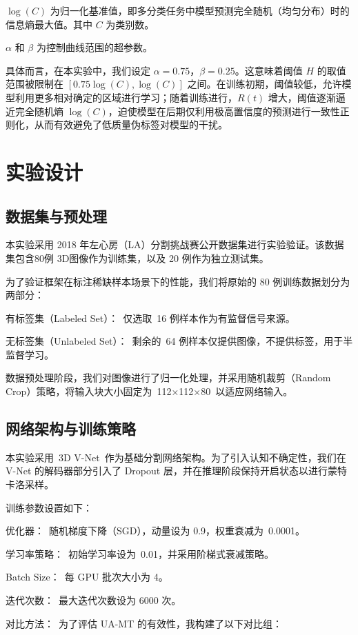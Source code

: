 \documentclass{xduugthesis}
\begin{document}
$\log(C)$ 为归一化基准值，即多分类任务中模型预测完全随机（均匀分布）时的信息熵最大值。其中 $C$ 为类别数。

$\alpha$ 和 $\beta$ 为控制曲线范围的超参数。


具体而言，在本实验中，我们设定 $\alpha=0.75$，$\beta=0.25$。这意味着阈值 $H$ 的取值范围被限制在 $[0.75\log(C), \log(C)]$ 之间。在训练初期，阈值较低，允许模型利用更多相对确定的区域进行学习；随着训练进行，$R(t)$ 增大，阈值逐渐逼近完全随机熵 $\log(C)$，迫使模型在后期仅利用极高置信度的预测进行一致性正则化，从而有效避免了低质量伪标签对模型的干扰。




\section{实验设计}
\subsection{数据集与预处理}
本实验采用 2018 年左心房（LA）分割挑战赛公开数据集进行实验验证。该数据集包含80例 3D图像作为训练集，以及 20 例作为独立测试集。

为了验证框架在标注稀缺样本场景下的性能，我们将原始的 80 例训练数据划分为两部分：

有标签集（Labeled Set）： 仅选取 16 例样本作为有监督信号来源。

无标签集（Unlabeled Set）： 剩余的 64 例样本仅提供图像，不提供标签，用于半监督学习。

数据预处理阶段，我们对图像进行了归一化处理，并采用随机裁剪（Random Crop）策略，将输入块大小固定为 112×112×80 以适应网络输入。

\subsection{网络架构与训练策略}

本实验采用 3D V-Net 作为基础分割网络架构。为了引入认知不确定性，我们在 V-Net 的解码器部分引入了 Dropout 层，并在推理阶段保持开启状态以进行蒙特卡洛采样。

训练参数设置如下：

优化器： 随机梯度下降（SGD），动量设为 0.9，权重衰减为 0.0001。

学习率策略： 初始学习率设为 0.01，并采用阶梯式衰减策略。

Batch Size： 每 GPU 批次大小为 4。

迭代次数： 最大迭代次数设为 6000 次。

对比方法： 为了评估 UA-MT 的有效性，我构建了以下对比组：
\end{document}

